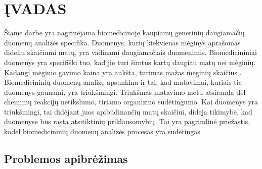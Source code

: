 
\newpage
\section*{ĮVADAS}



Šiame darbe yra nagrinėjama biomedicinoje kaupiamų genetinių daugiamačių duomenų analizės specifika. Duomenys, kurių kiekvienas mėginys aprašomas dideliu skaičiumi matų, yra vadinami daugiamačiais duomenimis. Biomedicininiai duomenys yra specifiški tuo, kad jie turi šimtus kartų daugiau matų nei mėginių. Kadangi mėginio gavimo kaina yra aukšta, turimas mažas mėginių skaičius \cite{pettersson2009generations}. Biomedicininių duomenų analizę apsunkina ir tai, kad matavimai, kuriais tie duomenys gaunami, yra triukšmingi. Triukšmas matavimo metu atsiranda dėl cheminių reakcijų netikslumo, tiriamo organizmo sudėtingumo. Kai duomenys yra triukšmingi, tai didėjant juos apibūdinančių matų skaičiui, didėja tikimybė, kad duomenyse bus rasta atsitiktinių priklausomybių. Tai yra pagrindinė priežastis, kodėl biomedicininių duomenų analizės procesas yra sudėtingas.



\subsection*{Problemos apibrėžimas}


